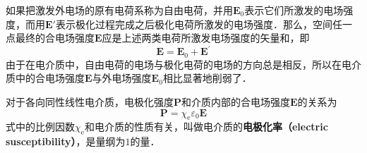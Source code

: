 

如果把激发外电场的原有电荷系称为自由电荷，并用$\mathbf E_0$表示它们所激发的电场强度，而用$\mathbf E'$表示极化过程完成之后极化电荷所激发的电场强度．那么，空间任一点最终的合电场强度$\mathbf E $应是上述两类电荷所激发电场强度的矢量和，即
\begin{equation}
\mathbf E=\mathbf E_{0}+\mathbf E^{\prime}
\end{equation}
由于在电介质中，自由电荷的电场与极化电荷的电场的方向总是相反，所以在电介质中的合电场强度$\mathbf E $与外电场强度$\mathbf E_0$相比显著地削弱了．

对于各向同性线性电介质，电极化强度$\mathbf P $和介质内部的合电场强度$\mathbf E $的关系为
\begin{equation} 
\mathbf P=\chi_{\mathrm e} \varepsilon_{0} \mathbf E
\end{equation}
式中的比例因数$\chi_{\mathrm{e}}$和电介质的性质有关，叫做电介质的\textbf{电极化率（electric susceptibility）}，是量纲为$1 $的量．

